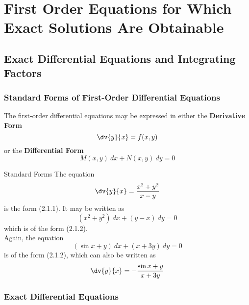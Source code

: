 
\section{First Order Equations for Which Exact Solutions Are Obtainable}


\subsection{Exact Differential Equations and Integrating Factors}


\subsubsection{Standard Forms of First-Order Differential Equations}
The first-order differential equations may be expressed in either the \textbf{Derivative Form}
\begin{equation}
    \dv{y}{x} = f(x,y)
\end{equation}
or the \textbf{Differential Form}
\begin{equation}
    M(x,y) \: d{x} + N(x,y) \: d{y} = 0
\end{equation}

\begin{example}{Standard Forms}{}
    The equation \[
        \dv{y}{x} = \frac{x^2 + y^2}{x-y}
    \]
    is the form (2.1.1). It may be written as \[
        (x^2 + y^2) \: dx + (y-x) \: dy = 0
    \] which is of the form (2.1.2). \\
    Again, the equation \[
        (\sin x + y) \: dx + (x + 3y) \: dy = 0
    \] is of the form (2.1.2), which can also be written as \[
    \dv{y}{x} = - \frac{\sin x + y}{x + 3y}
    \]
\end{example}

\vspace{20pt}
\subsubsection{Exact Differential Equations}

